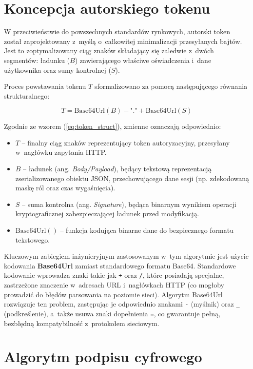 \documentclass{SGGW-thesis}
\begin{document}
\section{Koncepcja autorskiego tokenu}

W przeciwieństwie do powszechnych standardów rynkowych, autorski token został zaprojektowany z~myślą o~całkowitej minimalizacji przesyłanych bajtów. Jest to zoptymalizowany ciąg znaków składający się zaledwie z~dwóch segmentów: ładunku ($B$) zawierającego właściwe oświadczenia i~dane użytkownika oraz sumy kontrolnej ($S$). 

Proces powstawania tokenu $T$ sformalizowano za pomocą następującego równania strukturalnego:

\begin{equation}
T = \text{Base64Url}(B) + \text{"."} + \text{Base64Url}(S)
\label{eq:token_struct}
\end{equation}

Zgodnie ze wzorem (\ref{eq:token_struct}), zmienne oznaczają odpowiednio:
\begin{itemize}
    \item $T$ – finalny ciąg znaków reprezentujący token autoryzacyjny, przesyłany w~nagłówku zapytania HTTP.
    \item $B$ – ładunek (ang. \textit{Body/Payload}), będący tekstową reprezentacją zserializowanego obiektu JSON, przechowującego dane sesji (np. zdekodowaną maskę ról oraz czas wygaśnięcia).
    \item $S$ – suma kontrolna (ang. \textit{Signature}), będąca binarnym wynikiem operacji kryptograficznej zabezpieczającej ładunek przed modyfikacją.
    \item $\text{Base64Url}()$ – funkcja kodująca binarne dane do bezpiecznego formatu tekstowego.
\end{itemize}

Kluczowym zabiegiem inżynieryjnym zastosowanym w~tym algorytmie jest użycie kodowania \textbf{Base64Url} zamiast standardowego formatu Base64. Standardowe kodowanie wprowadza znaki takie jak \texttt{+} oraz \texttt{/}, które posiadają specjalne, zastrzeżone znaczenie w~adresach URL i~nagłówkach HTTP (co mogłoby prowadzić do błędów parsowania na poziomie sieci). Algorytm Base64Url rozwiązuje ten problem, zastępując je odpowiednio znakami \texttt{-} (myślnik) oraz \texttt{\_} (podkreślenie), a~także usuwa znaki dopełnienia \texttt{=}, co gwarantuje pełną, bezbłędną kompatybilność z~protokołem sieciowym.

\section{Algorytm podpisu cyfrowego}
\end{document}
